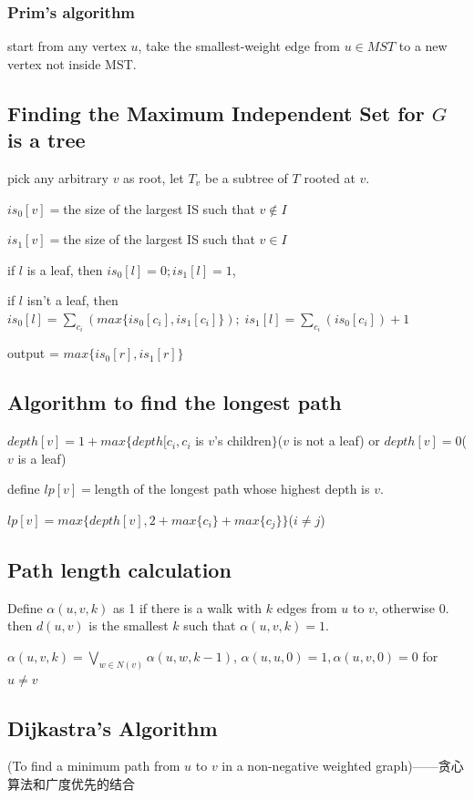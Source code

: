 \documentclass[12pt,a4paper]{ctexrep}
\begin{document}
\subsubsection{Prim's algorithm}
start from any vertex $u$, take the smallest-weight edge from $u \in MST$ to a new vertex not inside MST.

\subsection{Finding the Maximum Independent Set for $G$ is a tree}
pick any arbitrary $v$ as root, let $T_{v}$ be a subtree of $T$ rooted at $v$.

$is_{0}[v] = $the size of the largest IS such that $v \notin I$

$is_{1}[v] = $the size of the largest IS such that $v \in I$

if $l$ is a leaf, then $is_{0}[l] = 0;is_{1}[l] = 1$,

if $l$ isn't a leaf, then $is_{0}[l] = \sum_{c_{i}}(max\{is_{0}[c_{i}], is_{1}[c_{i}]\});\; is_{1}[l] = \sum_{c_{i}}(is_{0}[c_{i}])+1$

output = $max\{is_{0}[r],is_{1}[r]\}$

\subsection{Algorithm to find the longest path} \label{sec:Algo_to_longest_path}
$depth[v] = 1+max\{depth[c_{i},c_{i}$ is $v$'s children$\}$($v$ is not a leaf) or $depth[v] = 0$($v$ is a leaf)

define $lp[v] = $length of the longest path whose highest depth is $v$.

$lp[v] = max\{depth[v],2+max\{c_{i}\}+max\{c_{j}\}\}$($i \neq j$)

\subsection{Path length calculation}
Define $\alpha(u,v,k)$ as 1 if there is a walk with $k$ edges from $u$ to $v$, otherwise 0. then $d(u,v)$ is the smallest $k$ such that $\alpha(u,v,k)=1$.

$\alpha(u,v,k) = \bigvee_{w\in N(v)} \alpha(u,w,k-1)$, $\alpha(u,u,0)=1, \alpha(u,v,0)=0$ for $u \neq v$

\subsection{Dijkastra's Algorithm}
(To find a minimum path from $u$ to $v$ in a non-negative weighted graph)——贪心算法和广度优先的结合
\end{document}
